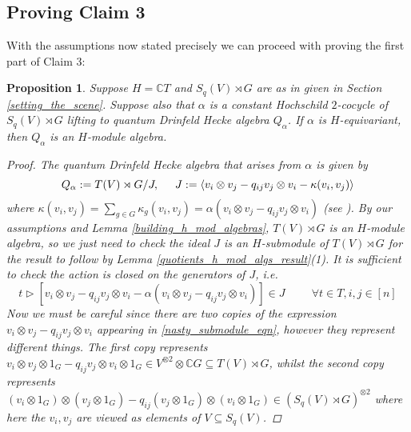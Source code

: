 \documentclass[10pt]{article}
\newcommand{\bb}{\medbreak}
\newcommand{\nt}{\noindent}
\newcommand{\Cc }{\mathbb{C}}
\newtheorem{proposition}[lemma]{Proposition}
\theoremstyle{definition}
\begin{document}
\subsection{Proving Claim 3}\label{claim_3}

\nt With the assumptions now stated precisely we can proceed with proving the first part of Claim 3:

\begin{proposition}\label{is_an_h_mod_alg} Suppose $H=\Cc  T$ and $S_q(V)\rtimes G$ are as in given in Section \ref{setting_the_scene}. Suppose also that $\alpha$ is a constant Hochschild $2$-cocycle of $S_q(V)\rtimes G$ lifting to quantum Drinfeld Hecke algebra $Q_\alpha$. If $\alpha$ is $H$-equivariant, then $Q_\alpha$ is an $H$-module algebra.
\begin{proof}
The quantum Drinfeld Hecke algebra that arises from $\alpha$ is given by
$$Q_\alpha:=T(V)\rtimes G/J,\hspace{.5cm} J:=\langle v_i\otimes v_j-q_{ij}v_j\otimes v_i-\kappa (v_i,v_j)\rangle$$
where $\kappa(v_i,v_j)=\sum_{g\in G}\kappa_g(v_i,v_j)=\alpha(v_i\otimes v_j-q_{ij}v_j\otimes v_i)$ (see \cite[proof of Theorem 4.4]{2011arXiv11115243N}). By our assumptions and Lemma \ref{building_h_mod_algebras}, $T(V)\rtimes G$ is an $H$-module algebra, so we just need to check the ideal $J$ is an $H$-submodule of $T(V)\rtimes G$ for the result to follow by Lemma \ref{quotients_h_mod_algs_result}(1). It is sufficient to check the action is closed on the generators of $J$, i.e.
\begin{equation}\label{nasty_submodule_eqn}
t\rhd [v_i\otimes v_j-q_{ij}v_j\otimes v_i-\alpha(v_i\otimes v_j-q_{ij}v_j\otimes v_i)]\in J\hspace{1cm} \forall t\in T, i,j\in [n]
\end{equation}
Now we must be careful since there are two copies of the expression $v_i\otimes v_j-q_{ij}v_j\otimes v_i$ appearing in \eqref{nasty_submodule_eqn}, however they represent different things. The first copy represents $v_i\otimes v_j\otimes 1_G-q_{ij}v_j\otimes v_i\otimes 1_G\in V^{\otimes 2}\otimes \Cc  G\subseteq T(V)\rtimes G$, whilst the second copy represents $(v_i\otimes 1_G)\otimes (v_j\otimes 1_G)-q_{ij}(v_j\otimes 1_G)\otimes (v_i\otimes 1_G)\in (S_q(V)\rtimes G)^{\otimes 2}$ where here the $v_i,v_j$ are viewed as elements of $V\subseteq S_q(V)$.\bb


\end{proof}
\end{proposition}
\end{document}
